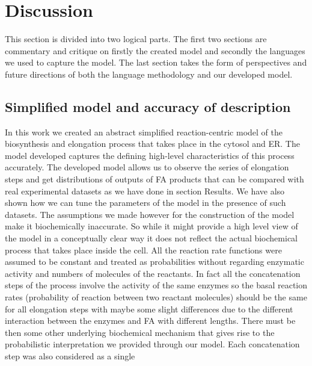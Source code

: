 \chapter{Discussion}

\ifpdf
    \graphicspath{{Discussion/Figs/Raster/}{Discussion/Figs/PDF/}{Discussion/Figs/}}
\else
    \graphicspath{{Discussion/Figs/Vector/}{Discussion/Figs/}}
\fi

This section is divided into two logical parts. The first two
sections are commentary and critique on firstly the created model and
secondly the languages we used to capture the model. The last section
takes the form of perspectives and future directions of both the
language methodology and our developed model.

\section{Simplified model and accuracy of description}
In this work we created an abstract simplified reaction-centric model
of the biosynthesis and elongation
process that takes place in the cytosol and ER. The model developed captures the defining high-level
characteristics of this process accurately. The developed model allows
us to observe the series of elongation steps and get distributions of
outputs of FA products that can be compared with real experimental
datasets as we have done in section Results. We have also shown how
we can tune the parameters of the model in the presence of such datasets. The assumptions we made however
for the construction of the model make it biochemically
inaccurate. So while it might provide a high level view of the model
in a conceptually clear way it does not reflect the
actual biochemical process that takes place inside the cell. All the
reaction rate functions were assumed to be constant and treated as
probabilities without regarding enzymatic activity and numbers of
molecules of the
reactants. In fact all the concatenation steps of the process involve
the activity of the same enzymes so the basal reaction rates
(probability of reaction between two reactant molecules) should be the same for
all elongation steps with maybe some slight differences due to the different interaction between the enzymes and FA with different lengths. There must be then some other underlying
biochemical mechanism that
gives rise to the probabilistic interpretation we provided through our
model. Each concatenation step was also considered as a single

